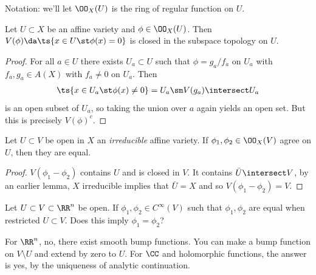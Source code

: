 Notation: we'll let \(\OO_X(U)\) is the ring of regular function on
\(U\).

\begin{proposition}[?]

Let \(U\subset X\) be an affine variety and \(\phi \in \OO_X(U)\). Then
\(V(\phi) \da \ts{x\in U \st \phi(x) = 0}\) is closed in the subspace
topology on \(U\).

\end{proposition}

\begin{proof}

For all \(a\in U\) there exists \(U_a\subset U\) such that
\(\phi = g_a/f_a\) on \(U_a\) with \(f_a, g_a \in A(X)\) with
\(f_a \neq 0\) on \(U_a\). Then
\begin{align*}  
\ts{x\in U_a \st \phi(x) \neq 0} = U_a \sm V(g_a)\intersect U_a
\end{align*} is an open subset of \(U_a\), so taking the union over
\(a\) again yields an open set. But this is precisely \(V(\phi)^c\).

\end{proof}

\begin{proposition}

Let \(U\subset V\) be open in \(X\) an \emph{irreducible} affine
variety. If \(\phi_1, \phi_2 \in \OO_X(V)\) agree on \(U\), then they
are equal.

\end{proposition}

\begin{proof}

\(V(\phi_1 - \phi_2)\) contains \(U\) and is closed in \(V\). It
contains \(\bar U\intersect V\), by an earlier lemma, \(X\) irreducible
implies that \(\bar U = X\) and so \(V(\phi_1 - \phi_2) =V\).

\end{proof}

\begin{question}

Let \(U\subset V \subset \RR^n\) be open. If
\(\phi_1, \phi_2 \in C^\infty(V)\) such that \(\phi_1, \phi_2\) are
equal when restricted \(U\subset V\). Does this imply
\(\phi_1 = \phi_2\)?

\end{question}

\begin{answer}

For \(\RR^n\), no, there exist smooth bump functions. You can make a
bump function on \(V\setminus U\) and extend by zero to \(U\). For
\(\CC\) and holomorphic functions, the answer is yes, by the uniqueness
of analytic continuation.

\end{answer}

